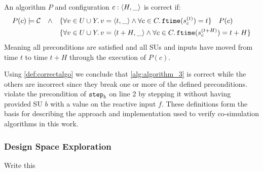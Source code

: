 \begin{definition}\label{def:correctalgo}
  An algorithm $P$ and configuration $c:  \left\langle H, \_ \right\rangle $ is correct if:
  \begin{align*}
     P(c) \models \mathcal{C} \quad \land \quad
     &\{\forall v \in U \cup Y \ldotp v =  \left\langle t, \_ \right\rangle  \land \forall c \in C \ldotp \mathtt{ftime}(s_{c}^{(t)}) = t\} \quad P(c) \\
     & \{\forall v \in U \cup Y \ldotp v =  \left\langle t+H, \_ \right\rangle  \land \forall c \in C \ldotp \mathtt{ftime}(s_{c}^{(t+H)}) = t+H \}
  \end{align*}
  Meaning all preconditions are satisfied and all SUs and inputs have moved from time $t$ to time $t+H$ through the execution of $P(c)$.
\end{definition}

Using \cref{def:correctalgo} we conclude that \cref{alg:algorithm_3} is correct while the others are incorrect since they break one or more of the defined preconditions.  violate the precondition of $\mathtt{step}_{b}$ on line 2 by stepping it without having provided SU $b$ with a value on the reactive input $f$. 
These definitions form the basis for describing the approach and implementation used to verify co-simulation algorithms in this work.


\subsubsection{Design Space Exploration}
Write this